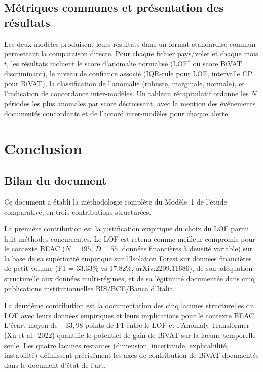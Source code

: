 \documentclass[12pt,a4paper]{article}
\begin{document}
\subsection{Métriques communes et présentation des résultats}

Les deux modèles produisent leurs résultats dans un format standardisé commun
permettant la comparaison directe. Pour chaque fichier pays/volet et chaque
mois $t$, les résultats incluent le score d'anomalie normalisé (LOF$^*$
ou score BiVAT discriminant), le niveau de confiance associé (IQR-rule pour
LOF, intervalle CP pour BiVAT), la classification de l'anomalie (robuste,
marginale, normale), et l'indication de concordance inter-modèles. Un tableau
récapitulatif ordonne les $N$ périodes les plus anomales par score décroissant,
avec la mention des événements documentés concordants et de l'accord
inter-modèles pour chaque alerte.

\section{Conclusion}

\subsection{Bilan du document}

Ce document a établi la méthodologie complète du Modèle~1 de l'étude
comparative, en trois contributions structurées.

La première contribution est la justification empirique du choix du LOF parmi
huit méthodes concurrentes. Le LOF est retenu comme meilleur compromis pour
le contexte BEAC ($N = 195$, $D = 55$, données financières à densité variable)
sur la base de sa supériorité empirique sur l'Isolation Forest sur données
financières de petit volume (F1 = 33.33\% vs 17.82\%, arXiv:2209.11686), de
son adéquation structurelle aux données multi-régimes, et de sa légitimité
documentée dans cinq publications institutionnelles BIS/BCE/Banca d'Italia.

La deuxième contribution est la documentation des cinq lacunes structurelles
du LOF avec leurs données empiriques et leurs implications pour le contexte
BEAC. L'écart moyen de $-33{,}98$ points de F1 entre le LOF et l'Anomaly
Transformer (Xu et al.\ 2022) quantifie le potentiel de gain de BiVAT sur
la lacune temporelle seule. Les quatre lacunes restantes (dimension, incertitude,
explicabilité, instabilité) définissent précisément les axes de contribution
de BiVAT documentés dans le document d'état de l'art.
\end{document}
